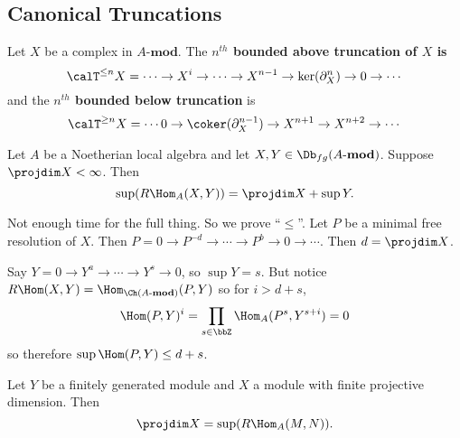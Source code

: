 \documentclass[12pt]{article}
\newcommand*{\Amod}{A\text{-}\mathbf{mod}}
\begin{document}
\subsection{Canonical Truncations}
\begin{defn}
	Let $X$ be a complex in $\Amod$. The \textbf{$n^{th}$ bounded above truncation of $X$ is}
	\[\calT^{\le n}X=\cdots\to X^i\to\cdots\to X^{n-1}\to\ker(\partial_X^n)\to 0\to \cdots\]
	and the \textbf{$n^{th}$ bounded below truncation} is
	\[\calT^{\ge n}X=\cdots 0\to\coker(\partial_X^{n-1})\to X^{n+1}\to X^{n+2}\to\cdots\]
\end{defn}
\begin{thm}
	Let $A$ be a Noetherian local algebra and let $X,Y\in\Db_{fg}(\Amod)$. Suppose $\projdim X<\infty$.
	Then 
	\[\sup(R\Hom_A(X,Y))=\projdim X+\sup Y.\]
\end{thm}
\begin{prf}
	Not enough time for the full thing. So we prove ``$\le$''. Let $P$ be a minimal free resolution of $X$. Then 
	$P=0\to P^{-d}\to\cdots\to P^b\to 0\to\cdots$. Then $d=\projdim X$. 

	Say $Y=0\to Y^a\to\cdots\to Y^s\to 0$, so $\sup Y=s$. But notice $R\Hom(X,Y)=\Hom_{\Ch(\Amod)}(P,Y)$
	so for $i>d+s$,
	\[\Hom(P,Y)^i=\prod_{s\in\bbZ}\Hom_A(P^s,Y^{s+i})=0\]
	so therefore $\sup \Hom(P,Y)\le d+s$.
\end{prf}
\begin{cor}
	Let $Y$ be a finitely generated module and $X$ a module with finite projective dimension. Then 
	\[\projdim X=\sup(R\Hom_A(M,N)).\]
\end{cor}
\end{document}

